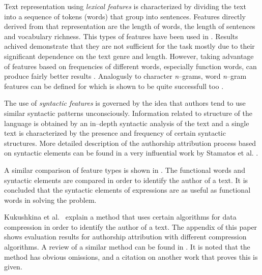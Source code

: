 \documentclass{llncs}
\begin{document}
Text representation using \emph{lexical features} is characterized by dividing
the text into a sequence of tokens (words) that group into sentences. Features
directly derived from that representation are the length of words, the
length of sentences and vocabulary richness. This types of features have been used in
\cite{mendenhall1887,holmes1994authorship} . Results achived demonstrate that
they are not sufficient for the task mostly due to their
significant dependence on the text genre and length. However, taking advantage of
features based on frequencies of different words, especially function words,
can produce fairly better results
\cite{argamon2005measuring,uzuner2005comparative,koppel2003exploiting,zhao2005effective}.
Analogusly to character \emph{n}--grams, word \emph{n}--gram features
can be defined for which is shown to be quite successfull too
\cite{keselj2003n,coyotl2006authorship}.

The use of \emph{syntactic features} is governed by the idea that authors tend
to use similar syntactic patterns unconsciously. Information related to structure of
the language is obtained by an in--depth syntactic analysis of the text and a
single text is characterized by the presence and frequency of certain syntactic
structures. More detailed description of the authorship attribution process based
on syntactic elements can be found in a very influential work by Stamatos et al.
\cite{stamatatos2001computer}.

A similar comparison of feature types is shown in
\cite{uzuner2005comparative}. The functional words and syntactic
elements are compared in order to identify the author of a text. It is
concluded that the syntactic elements of expressions are as useful as functional 
words in solving the problem.

Kukushkina et al.\ \cite{kukushkina2001using} explain a method that uses certain
algorithms for data compression in order to identify the author of a text. The
appendix of this paper shows evaluation results for authorship attribution with
different compression algorithms.
A review of a similar method can be found in 
\cite{zhao2005effective}. It is noted that the method has obvious omissions, 
and a citation on another work that proves this is given.
\end{document}
